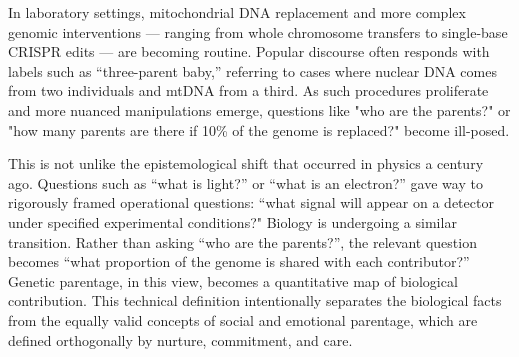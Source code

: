 \begin{commentary}
In laboratory settings, mitochondrial DNA replacement and more complex genomic interventions — ranging from whole chromosome transfers to single-base CRISPR edits — are becoming routine. Popular discourse often responds with labels such as “three-parent baby,” referring to cases where nuclear DNA comes from two individuals and mtDNA from a third. As such procedures proliferate and more nuanced manipulations emerge, questions like "who are the parents?" or "how many parents are there if 10\% of the genome is replaced?" become ill-posed.

This is not unlike the epistemological shift that occurred in physics a century ago. Questions such as “what is light?” or “what is an electron?” gave way to rigorously framed operational questions: “what signal will appear on a detector under specified experimental conditions?" Biology is undergoing a similar transition. Rather than asking “who are the parents?”, the relevant question becomes “what proportion of the genome is shared with each contributor?” Genetic parentage, in this view, becomes a quantitative map of biological contribution. This technical definition intentionally separates the biological facts from the equally valid concepts of social and emotional parentage, which are defined orthogonally by nurture, commitment, and care.
\end{commentary}
\clearpage

